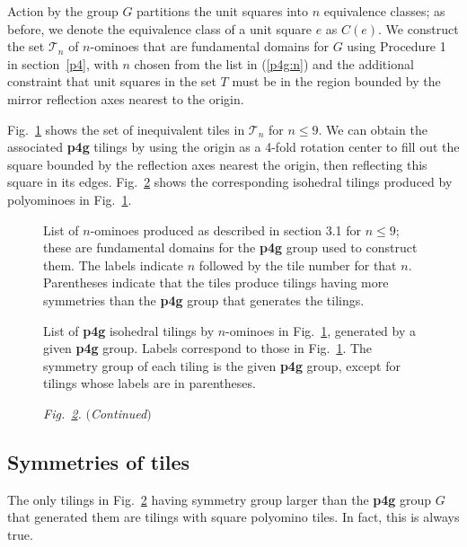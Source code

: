 \documentclass{ws-ijcga}
\begin{document}
Action by the group $G$ partitions the unit squares into $n$ equivalence classes; as before, we
denote the equivalence class of a unit square $e$ as $C(e)$. 
We construct the set $\mathscr{T}_n$ of $n$-ominoes
that are fundamental domains for $G$ using Procedure 1 in section~\ref{p4}, 
with $n$ chosen from the list in (\ref{p4g:n}) and the additional constraint that unit squares in the set $T$ must
be in the region bounded by the mirror reflection axes nearest to the origin.

Fig.~\ref{p4gfighi} shows the set of inequivalent tiles in $\mathscr{T}_n$ for $n \le 9$. 
We can obtain the associated {\bf p4g} tilings by using the origin as a 4-fold rotation center to fill out the square
bounded by the reflection axes nearest the origin, then reflecting this square in its edges.
Fig.~\ref{p4gtiling} shows the corresponding isohedral tilings produced by polyominoes in Fig.~\ref{p4gfighi}.
\begin{figure}[h]
\centerline{}
\vspace*{8pt}
\caption{
List of $n$-ominoes produced as described in section 3.1 for $n \le 9$; 
these are fundamental domains for
the {\bf p4g} group used to construct them. 
The labels indicate $n$ followed by the tile number for that $n$.
Parentheses indicate that the tiles produce tilings having more symmetries than the {\bf p4g} group that
generates the tilings.
\label{p4gfighi}
}
\end{figure}

\begin{figure}\centerline{}
\vspace*{8pt}
\caption{
List of {\bf p4g} isohedral tilings by $n$-ominoes in Fig.~\ref{p4gfighi}, 
generated by a given {\bf p4g} group. 
Labels correspond to those in Fig.~\ref{p4gfighi}. 
The symmetry group of each tiling is the given {\bf p4g} group, 
except for tilings whose labels are in parentheses.
\label{p4gtiling}
}
\end{figure}
\begin{figure}\centerline{}
\vspace*{8pt}
    \fontsize{8pt}{0pt}\selectfont
    {\it Fig.~\ref{p4gtiling}.} $(${\it Continued}$)$
\end{figure}




\subsection{Symmetries of tiles}
The only tilings in Fig.~\ref{p4gtiling} having symmetry group larger than the {\bf p4g} group $G$ that generated
them are tilings with square polyomino tiles. 
In fact, this is always true.
\end{document}
